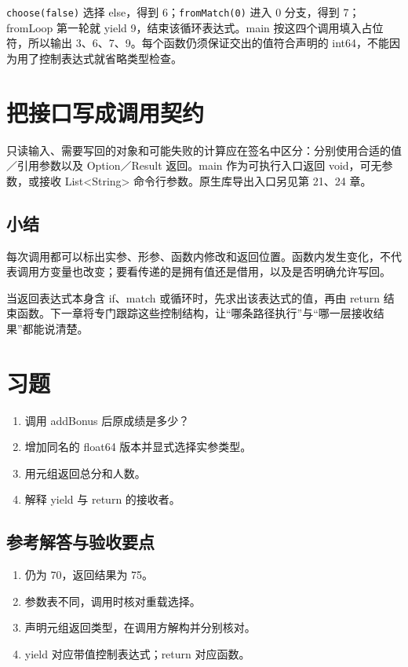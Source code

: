 \texttt{choose(\allowbreak{}false)\allowbreak{}} 选择 else，得到 6；\texttt{from\allowbreak{}Match(\allowbreak{}0)\allowbreak{}} 进入 0 分支，得到 7；fromLoop 第一轮就 yield 9，结束该循环表达式。main 按这四个调用填入占位符，所以输出 3、6、7、9。每个函数仍须保证交出的值符合声明的 int64，不能因为用了控制表达式就省略类型检查。

\section{把接口写成调用契约}

只读输入、需要写回的对象和可能失败的计算应在签名中区分：分别使用合适的值／引用参数以及 Option／Result 返回。main 作为可执行入口返回 void，可无参数，或接收 List<String> 命令行参数。原生库导出入口另见第 21、24 章。

\subsection*{小结}

每次调用都可以标出实参、形参、函数内修改和返回位置。函数内发生变化，不代表调用方变量也改变；要看传递的是拥有值还是借用，以及是否明确允许写回。

当返回表达式本身含 if、match 或循环时，先求出该表达式的值，再由 return 结束函数。下一章将专门跟踪这些控制结构，让“哪条路径执行”与“哪一层接收结果”都能说清楚。

\section{习题}

\begin{enumerate}

\item 调用 addBonus 后原成绩是多少？

\item 增加同名的 float64 版本并显式选择实参类型。

\item 用元组返回总分和人数。

\item 解释 yield 与 return 的接收者。

\end{enumerate}

\subsection*{参考解答与验收要点}

\begin{enumerate}

\item 仍为 70，返回结果为 75。

\item 参数表不同，调用时核对重载选择。

\item 声明元组返回类型，在调用方解构并分别核对。

\item yield 对应带值控制表达式；return 对应函数。

\end{enumerate}

